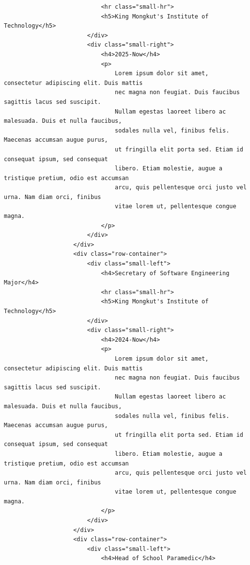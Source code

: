 \documentclass[12pt]{report} %
\begin{document}
\begin{verbatim}
                            <hr class="small-hr">
                            <h5>King Mongkut's Institute of Technology</h5>
                        </div>
                        <div class="small-right">
                            <h4>2025-Now</h4>
                            <p>
                                Lorem ipsum dolor sit amet, consectetur adipiscing elit. Duis mattis 
                                nec magna non feugiat. Duis faucibus sagittis lacus sed suscipit. 
                                Nullam egestas laoreet libero ac malesuada. Duis et nulla faucibus, 
                                sodales nulla vel, finibus felis. Maecenas accumsan augue purus, 
                                ut fringilla elit porta sed. Etiam id consequat ipsum, sed consequat 
                                libero. Etiam molestie, augue a tristique pretium, odio est accumsan 
                                arcu, quis pellentesque orci justo vel urna. Nam diam orci, finibus 
                                vitae lorem ut, pellentesque congue magna.
                            </p>
                        </div>
                    </div>
                    <div class="row-container">
                        <div class="small-left">
                            <h4>Secretary of Software Engineering Major</h4>
                            <hr class="small-hr">
                            <h5>King Mongkut's Institute of Technology</h5>
                        </div>
                        <div class="small-right">
                            <h4>2024-Now</h4>
                            <p>
                                Lorem ipsum dolor sit amet, consectetur adipiscing elit. Duis mattis 
                                nec magna non feugiat. Duis faucibus sagittis lacus sed suscipit. 
                                Nullam egestas laoreet libero ac malesuada. Duis et nulla faucibus, 
                                sodales nulla vel, finibus felis. Maecenas accumsan augue purus, 
                                ut fringilla elit porta sed. Etiam id consequat ipsum, sed consequat 
                                libero. Etiam molestie, augue a tristique pretium, odio est accumsan 
                                arcu, quis pellentesque orci justo vel urna. Nam diam orci, finibus 
                                vitae lorem ut, pellentesque congue magna.
                            </p>
                        </div>
                    </div>
                    <div class="row-container">
                        <div class="small-left">
                            <h4>Head of School Paramedic</h4>

\end{verbatim}
\end{document}

